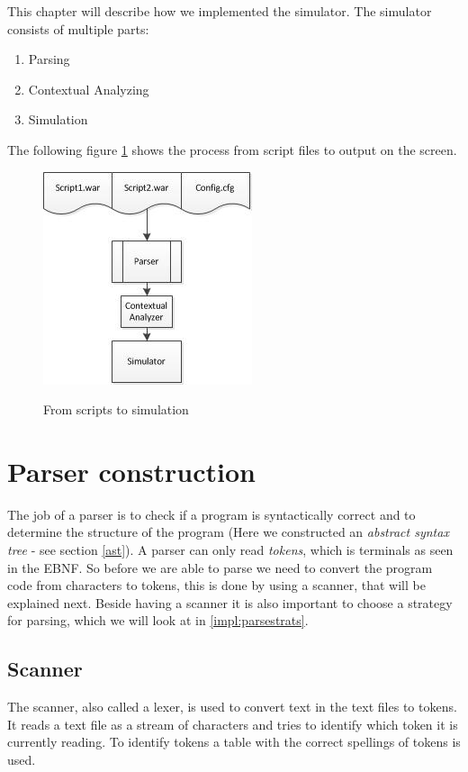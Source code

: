 This chapter will describe how we implemented the simulator. The simulator consists of multiple parts: \\
\begin{enumerate}
	\item Parsing
	\item Contextual Analyzing
	\item Simulation
\end{enumerate}

The following figure \ref{fig:scripttosimu} shows the process from script files to output on the screen.

\begin{figure}[H]
\centering
\includegraphics[scale=1.2]{rapport/6/figures/script_to_simu}
\label{fig:scripttosimu}
\caption{From scripts to simulation}
\end{figure}

\section{Parser construction}
	The job of a parser is to check if a program is syntactically correct and 
	to determine the structure of the program (Here we constructed an {\it abstract syntax tree} - see section \ref{ast}).
	A parser can only read {\it tokens}, which is terminals as seen in the EBNF. So before we are able to parse we need to convert 
	the program code from characters to tokens, this is done by using a scanner, that will be explained next. Beside having a scanner it is 
	also important to choose a strategy for parsing, which we will look at in \ref{impl:parsestrats}.
	
	\subsection{Scanner}
		The scanner, also called a lexer, is used to convert text in the text files to tokens. 
		It reads a text file as a stream of characters and tries to identify which token it is currently reading.
		To identify tokens a table with the correct spellings of tokens is used.			 
		
